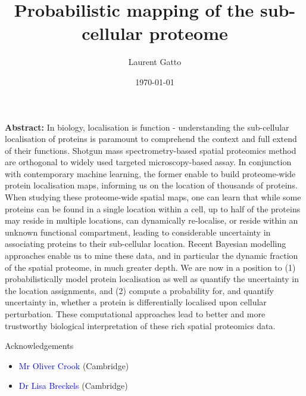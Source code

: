 \documentclass{beamer}
\title{Probabilistic mapping  of the sub-cellular proteome}
\author[]{Laurent Gatto}
\date{\today}
\institute[]{CBIO, de Duve Institute, UCLouvain}
\theoremstyle{example}
\begin{document}



\begin{frame}[plain]
\titlepage
\end{frame}


\begin{frame}%


\justify

{\small \textbf{Abstract:} In biology, localisation is function -
  understanding the sub-cellular localisation of proteins is paramount
  to comprehend the context and full extend of their
  functions. Shotgun mass spectrometry-based spatial proteomics method
  are orthogonal to widely used targeted microscopy-based assay. In
  conjunction with contemporary machine learning, the former enable to
  build proteome-wide protein localisation maps, informing us on the
  location of thousands of proteins. When studying these proteome-wide
  spatial maps, one can learn that while some proteins can be found in
  a single location within a cell, up to half of the proteins may
  reside in multiple locations, can dynamically re-localise, or reside
  within an unknown functional compartment, leading to considerable
  uncertainty in associating proteins to their sub-cellular
  location. Recent Bayesian modelling approaches enable us to mine
  these data, and in particular the dynamic fraction of the spatial
  proteome, in much greater depth. We are now in a position to (1)
  probabilistically model protein localisation as well as quantify the
  uncertainty in the location assignments, and (2) compute a
  probability for, and quantify uncertainty in, whether a protein is
  differentially localised upon cellular perturbation. These
  computational approaches lead to better and more trustworthy
  biological interpretation of these rich spatial proteomics data.  }


\end{frame}


\begin{frame}{Acknowledgements}

  \begin{itemize}

  \item \textcolor{Blue}{Mr Oliver Crook} (Cambridge)

  \item \textcolor{Blue}{Dr Lisa Breckels} (Cambridge)

  \end{itemize}


\end{frame}
\end{document}
